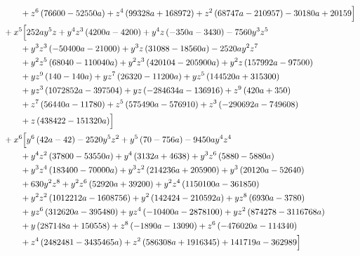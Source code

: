 \begin{align*}
&\qquad + z^{6} \left(76600 - 52550 a\right) + z^{4} \left(99328 a + 168972\right) + z^{2} \left(68747 a - 210957\right) - 30180 a + 20159\Bigr]\\
&{}+x^{5}\Bigl[252 a y^{5} z + y^{4} z^{3} \left(4200 a - 4200\right) + y^{4} z \left(- 350 a - 3430\right) - 7560 y^{3} z^{5}\\
&\qquad + y^{3} z^{3} \left(- 50400 a - 21000\right) + y^{3} z \left(31088 - 18560 a\right) - 2520 a y^{2} z^{7}\\
&\qquad + y^{2} z^{5} \left(68040 - 110040 a\right) + y^{2} z^{3} \left(420104 - 205900 a\right) + y^{2} z \left(157992 a - 97500\right)\\
&\qquad + y z^{9} \left(140 - 140 a\right) + y z^{7} \left(26320 - 11200 a\right) + y z^{5} \left(144520 a + 315300\right)\\
&\qquad + y z^{3} \left(1072852 a - 397504\right) + y z \left(- 284634 a - 136916\right) + z^{9} \left(420 a + 350\right)\\
&\qquad + z^{7} \left(56440 a - 11780\right) + z^{5} \left(575490 a - 576910\right) + z^{3} \left(- 290692 a - 749608\right)\\
&\qquad + z \left(438422 - 151320 a\right)\Bigr]\\
&{}+x^{6}\Bigl[y^{6} \left(42 a - 42\right) - 2520 y^{5} z^{2} + y^{5} \left(70 - 756 a\right) - 9450 a y^{4} z^{4}\\
&\qquad + y^{4} z^{2} \left(37800 - 53550 a\right) + y^{4} \left(3132 a + 4638\right) + y^{3} z^{6} \left(5880 - 5880 a\right)\\
&\qquad + y^{3} z^{4} \left(183400 - 70000 a\right) + y^{3} z^{2} \left(214236 a + 205900\right) + y^{3} \left(20120 a - 52640\right)\\
&\qquad + 630 y^{2} z^{8} + y^{2} z^{6} \left(52920 a + 39200\right) + y^{2} z^{4} \left(1150100 a - 361850\right)\\
&\qquad + y^{2} z^{2} \left(1012212 a - 1608756\right) + y^{2} \left(142424 - 210592 a\right) + y z^{8} \left(6930 a - 3780\right)\\
&\qquad + y z^{6} \left(312620 a - 395480\right) + y z^{4} \left(- 10400 a - 2878100\right) + y z^{2} \left(874278 - 3116768 a\right)\\
&\qquad + y \left(287148 a + 150558\right) + z^{8} \left(- 1890 a - 13090\right) + z^{6} \left(- 476020 a - 114340\right)\\
&\qquad + z^{4} \left(2482481 - 3435465 a\right) + z^{2} \left(586308 a + 1916345\right) + 141719 a - 362989\Bigr]\\

\end{align*}
